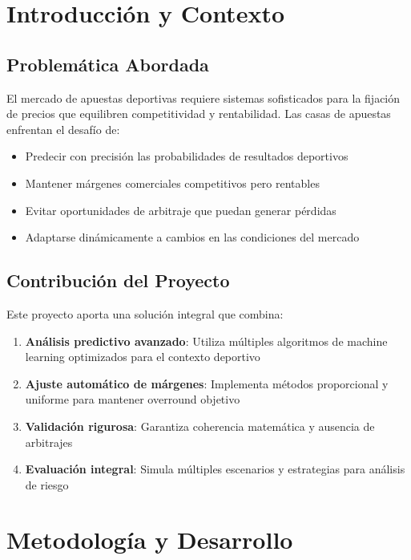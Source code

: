 \documentclass{article}
\begin{document}
\section{Introducción y Contexto}

\subsection{Problemática Abordada}

El mercado de apuestas deportivas requiere sistemas sofisticados para la fijación de precios que equilibren competitividad y rentabilidad. Las casas de apuestas enfrentan el desafío de:

\begin{itemize}
    \item Predecir con precisión las probabilidades de resultados deportivos
    \item Mantener márgenes comerciales competitivos pero rentables
    \item Evitar oportunidades de arbitraje que puedan generar pérdidas
    \item Adaptarse dinámicamente a cambios en las condiciones del mercado
\end{itemize}

\subsection{Contribución del Proyecto}

Este proyecto aporta una solución integral que combina:

\begin{enumerate}
    \item \textbf{Análisis predictivo avanzado}: Utiliza múltiples algoritmos de machine learning optimizados para el contexto deportivo
    \item \textbf{Ajuste automático de márgenes}: Implementa métodos proporcional y uniforme para mantener overround objetivo
    \item \textbf{Validación rigurosa}: Garantiza coherencia matemática y ausencia de arbitrajes
    \item \textbf{Evaluación integral}: Simula múltiples escenarios y estrategias para análisis de riesgo
\end{enumerate}

\section{Metodología y Desarrollo}
\end{document}
